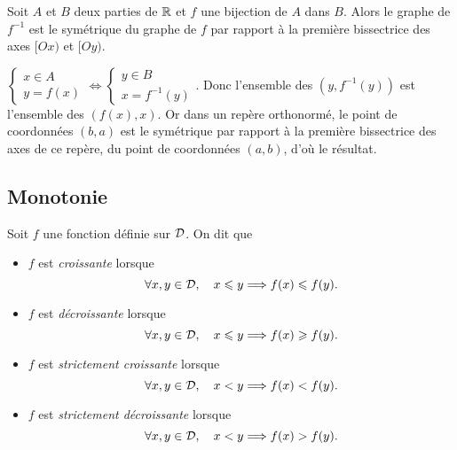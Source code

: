 \documentclass{magnoliaold}
\begin{document}
\begin{proposition}
Soit $A$ et $B$ deux parties de $\mathbb{R}$ et $f$ une bijection de $A$ dans
$B$. Alors le graphe de $f^{-1}$ est le symétrique du graphe de $f$ par
rapport à la première bissectrice des axes $[Ox)$ et $[Oy)$.
\end{proposition}
\begin{preuve}
$\begin{cases}x\in A\\ y=f(x)\end{cases}\Longleftrightarrow \begin{cases}y\in B\\ x=f^{-1}(y)\end{cases}$.
Donc l'ensemble des $(y,f^{-1}(y))$ est l'ensemble des $(f(x),x)$.
Or dans un repère orthonormé, le point de coordonnées $(b,a)$ est le symétrique par rapport à la première bissectrice des axes de ce repère, du point de coordonnées $(a,b)$, d'où le résultat.
\end{preuve}

\subsection{Monotonie}

\begin{definition}[utile=-3]
  Soit $f$ une fonction définie sur $\mathcal{D}$. On dit que
  \begin{itemize}
  \item $f$ est \emph{croissante} lorsque
    $$\forall x,y\in\mathcal{D} ,\quad x\leqslant y \Longrightarrow f(x)\leqslant f(y).$$
  \item $f$ est \emph{décroissante} lorsque
    $$\forall x,y\in\mathcal{D} ,\quad x\leqslant y \Longrightarrow f(x)\geqslant f(y).$$
  \item $f$ est \emph{strictement croissante} lorsque
    $$\forall x,y\in\mathcal{D} ,\quad x< y \Longrightarrow f(x)< f(y).$$
  \item $f$ est \emph{strictement décroissante} lorsque
    $$\forall x,y\in\mathcal{D} ,\quad x< y \Longrightarrow f(x)> f(y).$$
  \end{itemize}
\end{definition}
\end{document}
